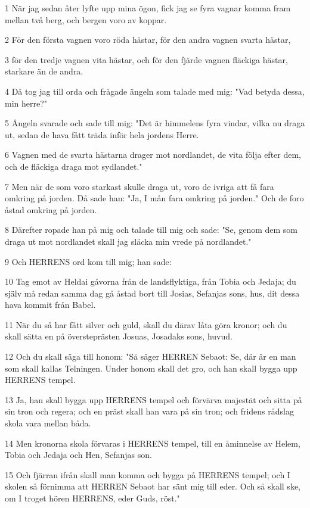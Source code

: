 \par 1 När jag sedan åter lyfte upp mina ögon, fick jag se fyra vagnar komma fram mellan två berg, och bergen voro av koppar.
\par 2 För den första vagnen voro röda hästar, för den andra vagnen svarta hästar,
\par 3 för den tredje vagnen vita hästar, och för den fjärde vagnen fläckiga hästar, starkare än de andra.
\par 4 Då tog jag till orda och frågade ängeln som talade med mig: "Vad betyda dessa, min herre?"
\par 5 Ängeln svarade och sade till mig: "Det är himmelens fyra vindar, vilka nu draga ut, sedan de hava fått träda inför hela jordens Herre.
\par 6 Vagnen med de svarta hästarna drager mot nordlandet, de vita följa efter dem, och de fläckiga draga mot sydlandet."
\par 7 Men när de som voro starkast skulle draga ut, voro de ivriga att få fara omkring på jorden. Då sade han: "Ja, I mån fara omkring på jorden." Och de foro åstad omkring på jorden.
\par 8 Därefter ropade han på mig och talade till mig och sade: "Se, genom dem som draga ut mot nordlandet skall jag släcka min vrede på nordlandet."
\par 9 Och HERRENS ord kom till mig; han sade:
\par 10 Tag emot av Heldai gåvorna från de landsflyktiga, från Tobia och Jedaja; du själv må redan samma dag gå åstad bort till Josias, Sefanjas sons, hus, dit dessa hava kommit från Babel.
\par 11 När du så har fått silver och guld, skall du därav låta göra kronor; och du skall sätta en på översteprästen Josuas, Josadaks sons, huvud.
\par 12 Och du skall säga till honom: "Så säger HERREN Sebaot: Se, där är en man som skall kallas Telningen. Under honom skall det gro, och han skall bygga upp HERRENS tempel.
\par 13 Ja, han skall bygga upp HERRENS tempel och förvärva majestät och sitta på sin tron och regera; och en präst skall han vara på sin tron; och fridens rådslag skola vara mellan båda.
\par 14 Men kronorna skola förvaras i HERRENS tempel, till en åminnelse av Helem, Tobia och Jedaja och Hen, Sefanjas son.
\par 15 Och fjärran ifrån skall man komma och bygga på HERRENS tempel; och I skolen så förnimma att HERREN Sebaot har sänt mig till eder. Och så skall ske, om I troget hören HERRENS, eder Guds, röst."


